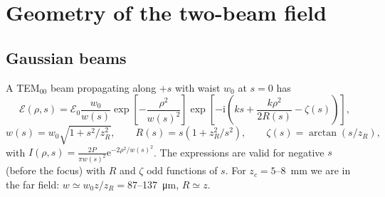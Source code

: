 \documentclass[11pt,a4paper]{article}
\newcommand{\ee}{\mathrm{e}}
\newcommand{\ii}{\mathrm{i}}
\begin{document}
\section{Geometry of the two-beam field}
\label{sec:geometry}

\subsection{Gaussian beams}
A TEM$_{00}$ beam propagating along $+s$ with waist $w_0$ at $s=0$ has~\cite{Siegman}
\begin{equation}
\mathcal E(\rho,s) = \mathcal E_0\frac{w_0}{w(s)}\exp\!\left[-\frac{\rho^2}{w(s)^2}\right]
\exp\!\left[-\ii\left(ks+\frac{k\rho^2}{2R(s)}-\zeta(s)\right)\right],
\label{eq:gauss}
\end{equation}
\begin{equation}
w(s)=w_0\sqrt{1+s^2/z_R^2},\qquad R(s)=s\left(1+z_R^2/s^2\right),\qquad \zeta(s)=\arctan(s/z_R),
\end{equation}
with $I(\rho,s)=\frac{2P}{\pi w(s)^2}\ee^{-2\rho^2/w(s)^2}$. The expressions are valid for negative $s$ (before the focus) with $R$ and $\zeta$ odd functions of $s$. For $z_c=5$--\SI{8}{mm} we are in the far field: $w\simeq w_0 z/z_R=87$--\SI{137}{\micro m}, $R\simeq z$.
\end{document}
